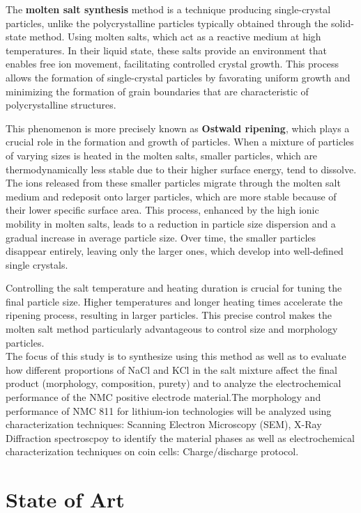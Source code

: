 \documentclass{article}
\begin{document}
{The \textbf{molten salt synthesis} method is a technique producing single-crystal particles, unlike the polycrystalline particles typically obtained through the solid-state method. Using molten salts, which act as a reactive medium at high temperatures. In their liquid state, these salts provide an environment that enables free ion movement, facilitating controlled crystal growth. This process allows the formation of single-crystal particles by favorating uniform growth and minimizing the formation of grain boundaries that are characteristic of polycrystalline structures.

This phenomenon is more precisely known as \textbf{Ostwald ripening}, which plays a crucial role in the formation and growth of particles. When a mixture of particles of varying sizes is heated in the molten salts, smaller particles, which are thermodynamically less stable due to their higher surface energy, tend to dissolve. The ions released from these smaller particles migrate through the molten salt medium and redeposit onto larger particles, which are more stable because of their lower specific surface area. This process, enhanced by the high ionic mobility in molten salts, leads to a reduction in particle size dispersion and a gradual increase in average particle size. Over time, the smaller particles disappear entirely, leaving only the larger ones, which develop into well-defined single crystals.

Controlling the salt temperature and heating duration is crucial for tuning the final particle size. Higher temperatures and longer heating times accelerate the ripening process, resulting in larger particles. This precise control makes the molten salt method particularly advantageous to control size and morphology particles. \\


The focus of this study is to synthesize using this method as well as to evaluate how different proportions of NaCl and KCl in the salt mixture affect the final product (morphology, composition, purety) and to analyze the electrochemical performance of the NMC positive electrode material.\cite{meltingp}The morphology and performance of NMC 811 for lithium-ion technologies will be analyzed using characterization techniques: Scanning Electron Microscopy (SEM), X-Ray Diffraction spectroscpoy to identify the material phases as well as electrochemical characterization techniques on coin cells: Charge/discharge protocol.

\section{State of Art}

}
\end{document}
